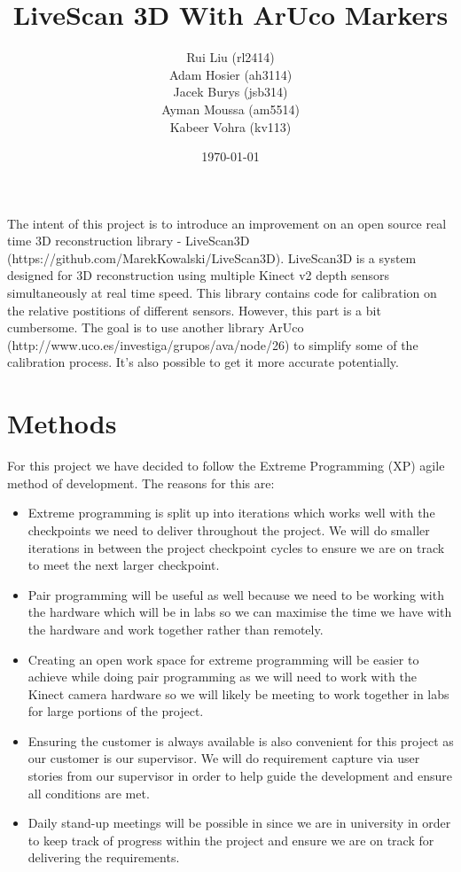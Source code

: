 \documentclass[a4paper,12pt]{article}
\title{LiveScan 3D With ArUco Markers}
\author{Rui Liu (rl2414)\\Adam Hosier (ah3114)\\Jacek Burys (jsb314)\\Ayman Moussa (am5514)\\Kabeer Vohra (kv113)}
\date{\today}
\begin{document}
\maketitle

The intent of this project is to introduce an improvement on an open source real time 3D reconstruction library - LiveScan3D (https://github.com/MarekKowalski/LiveScan3D).
LiveScan3D is a system designed for 3D reconstruction using multiple Kinect v2 depth sensors simultaneously at real time speed.
This library contains code for calibration on the relative postitions of different sensors. However, this part is a bit cumbersome.
The goal is to use another library ArUco (http://www.uco.es/investiga/grupos/ava/node/26) to simplify some of the calibration process. It's also possible to get it more accurate potentially.

\section*{Methods}
For this project we have decided to follow the Extreme Programming (XP) agile method of development. The reasons for this are:

\begin{itemize}
\item Extreme programming is split up into iterations which works well with the checkpoints we need to deliver throughout the project. We will do smaller iterations in between the project checkpoint cycles to ensure we are on track to meet the next larger checkpoint.
\item Pair programming will be useful as well because we need to be working with the hardware which will be in labs so we can maximise the time we have with the hardware and work together rather than remotely.
\item Creating an open work space for extreme programming will be easier to achieve while doing pair programming as we will need to work with the Kinect camera hardware so we will likely be meeting to work together in labs for large portions of the project.
\item Ensuring the customer is always available is also convenient for this project as our customer is our supervisor. We will do requirement capture via user stories from our supervisor in order to help guide the development and ensure all conditions are met.
\item Daily stand-up meetings will be possible in since we are in university in order to keep track of progress within the project and ensure we are on track for delivering the requirements.
\end{itemize}
\end{document}
